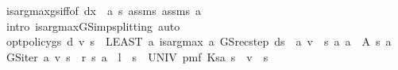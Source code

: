 \begin{isabellebody}
\ is{\isacharunderscore}{\kern0pt}arg{\isacharunderscore}{\kern0pt}max{\isacharunderscore}{\kern0pt}gs{\isacharunderscore}{\kern0pt}iff{\isacharbrackleft}{\kern0pt}of\ {\isachardoublequoteopen}d{\isacharparenleft}{\kern0pt}x\ {\isacharcolon}{\kern0pt}{\isacharequal}{\kern0pt}\ a{\isacharparenright}{\kern0pt}{\isachardoublequoteclose}\ s{\isacharbrackright}{\kern0pt}\ assms{\isacharparenleft}{\kern0pt}{}{\isacharparenright}{\kern0pt}\ assms\ a\ \isanewline
\ \ \ \ \isamarkupfalse%
\ {\isacharparenleft}{\kern0pt}intro\ is{\isacharunderscore}{\kern0pt}arg{\isacharunderscore}{\kern0pt}max{\isacharunderscore}{\kern0pt}GS{\isacharunderscore}{\kern0pt}imp{\isacharunderscore}{\kern0pt}splitting{\isacharprime}{\kern0pt}{\isacharparenright}{\kern0pt}\ auto\isanewline
{}\isamarkupfalse%
%
\endisatagproof
{\isafoldproof}%
%
\isadelimproof
\isanewline
%
\endisadelimproof
\isanewline
{}\isamarkupfalse%
\ {\isachardoublequoteopen}opt{\isacharunderscore}{\kern0pt}policy{\isacharunderscore}{\kern0pt}gs{\isacharprime}{\kern0pt}\ d\ v\ s\ {\isacharequal}{\kern0pt}\ {\isacharparenleft}{\kern0pt}LEAST\ a{\isachardot}{\kern0pt}\ is{\isacharunderscore}{\kern0pt}arg{\isacharunderscore}{\kern0pt}max\ {\isacharparenleft}{\kern0pt}{\isasymlambda}a{\isachardot}{\kern0pt}\ GS{\isacharunderscore}{\kern0pt}rec{\isacharunderscore}{\kern0pt}step\ {\isacharparenleft}{\kern0pt}d{\isacharparenleft}{\kern0pt}s\ {\isacharcolon}{\kern0pt}{\isacharequal}{\kern0pt}\ a{\isacharparenright}{\kern0pt}{\isacharparenright}{\kern0pt}\ v\ {\isachardollar}{\kern0pt}\ s{\isacharparenright}{\kern0pt}\ {\isacharparenleft}{\kern0pt}{\isasymlambda}a{\isachardot}{\kern0pt}\ a\ {\isasymin}\ A\ s{\isacharparenright}{\kern0pt}\ a{\isacharparenright}{\kern0pt}{\isachardoublequoteclose}\isanewline
\isanewline
{}\isamarkupfalse%
\ {\isachardoublequoteopen}GS{\isacharunderscore}{\kern0pt}iter\ a\ v\ s\ {\isacharequal}{\kern0pt}\ r\ {\isacharparenleft}{\kern0pt}s{\isacharcomma}{\kern0pt}\ a{\isacharparenright}{\kern0pt}\ {\isacharplus}{\kern0pt}\ l\ {\isacharasterisk}{\kern0pt}\ {\isacharparenleft}{\kern0pt}{\isasymSum}s{\isacharprime}{\kern0pt}\ {\isasymin}\ UNIV{\isachardot}{\kern0pt}\ pmf\ {\isacharparenleft}{\kern0pt}K{\isacharparenleft}{\kern0pt}s{\isacharcomma}{\kern0pt}a{\isacharparenright}{\kern0pt}{\isacharparenright}{\kern0pt}\ s{\isacharprime}{\kern0pt}\ {\isacharasterisk}{\kern0pt}\ v\ {\isachardollar}{\kern0pt}\ s{\isacharprime}{\kern0pt}{\isacharparenright}{\kern0pt}{\isachardoublequoteclose}\isanewline
\isanewline
{}\isamarkupfalse%

\end{isabellebody}
